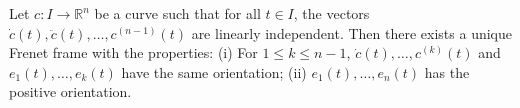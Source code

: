 Let $c: I \to \mathbb{R}^n$ be a curve such that for all $t \in I$, the vectors $\dot{c}(t), \ddot{c}(t), \ldots, c^{(n-1)}(t)$ are linearly independent. Then there exists a unique Frenet frame with the properties:
(i) For $1 \leq k \leq n-1$, $\dot{c}(t), \ldots, c^{(k)}(t)$ and $e_1(t), \ldots, e_k(t)$ have the same orientation;
(ii) $e_1(t), \ldots, e_n(t)$ has the positive orientation.